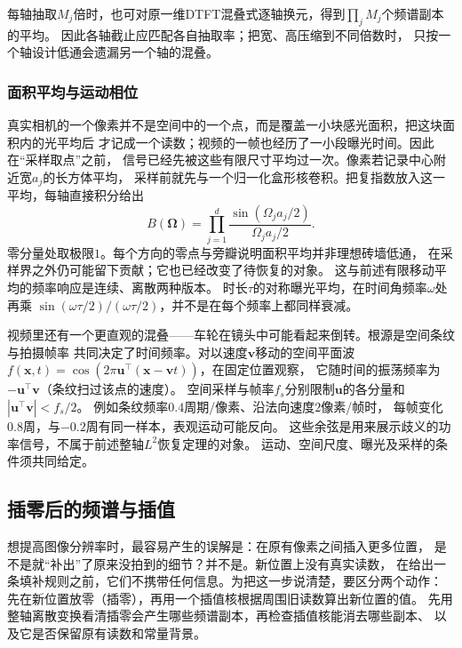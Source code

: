每轴抽取$M_j$倍时，也可对原一维DTFT混叠式逐轴换元，得到$\prod_jM_j$个频谱副本的平均。
因此各轴截止应匹配各自抽取率；把宽、高压缩到不同倍数时，
只按一个轴设计低通会遗漏另一个轴的混叠。

\subsubsection{面积平均与运动相位}
真实相机的一个像素并不是空间中的一个点，而是覆盖一小块感光面积，把这块面积内的光平均后
才记成一个读数；视频的一帧也经历了一小段曝光时间。因此在“采样取点”之前，
信号已经先被这些有限尺寸平均过一次。像素若记录中心附近宽$a_j$的长方体平均，
采样前就先与一个归一化盒形核卷积。把复指数放入这一平均，每轴直接积分给出
\begin{equation}
 B(\bm\Omega)=
 \prod_{j=1}^d\frac{\sin(\Omega_ja_j/2)}{\Omega_ja_j/2}.
 \label{eq:signal-box-aperture-response}
\end{equation}
零分量处取极限$1$。每个方向的零点与旁瓣说明面积平均并非理想砖墙低通，
在采样界之外仍可能留下贡献；它也已经改变了待恢复的对象。
这与前述有限移动平均的频率响应是连续、离散两种版本。
时长$\tau$的对称曝光平均，在时间角频率$\omega$处再乘
$\sin(\omega\tau/2)/(\omega\tau/2)$，并不是在每个频率上都同样衰减。

视频里还有一个更直观的混叠——车轮在镜头中可能看起来倒转。根源是空间条纹与拍摄帧率
共同决定了时间频率。对以速度$\bm v$移动的空间平面波
$f(\bm x,t)=\cos(2\pi\bm u^\top(\bm x-\bm v t))$，在固定位置观察，
它随时间的振荡频率为$-\bm u^\top\bm v$（条纹扫过该点的速度）。
空间采样与帧率$f_s$分别限制$\bm u$的各分量和$|\bm u^\top\bm v|<f_s/2$。
例如条纹频率$0.4$周期/像素、沿法向速度$2$像素/帧时，
每帧变化$0.8$周，与$-0.2$周有同一样本，表观运动可能反向。
这些余弦是用来展示歧义的功率信号，不属于前述整轴$L^2$恢复定理的对象。
运动、空间尺度、曝光及采样的条件须共同给定。

\subsection{插零后的频谱与插值}
\label{sec:signal-upsampling-interpolation}

想提高图像分辨率时，最容易产生的误解是：在原有像素之间插入更多位置，
是不是就“补出”了原来没拍到的细节？并不是。新位置上没有真实读数，
在给出一条填补规则之前，它们不携带任何信息。为把这一步说清楚，要区分两个动作：
先在新位置放零（插零），再用一个插值核根据周围旧读数算出新位置的值。
先用整轴离散变换看清插零会产生哪些频谱副本，再检查插值核能消去哪些副本、
以及它是否保留原有读数和常量背景。

